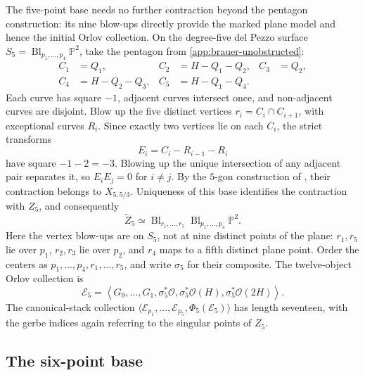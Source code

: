 \documentclass[11pt]{article}
\theoremstyle{plain}
\theoremstyle{definition}
\theoremstyle{remark}
\newcommand{\Pp}{\mathbb P}
\newcommand{\Bl}{\operatorname{Bl}}
\newcommand{\OO}{\mathcal O}
\begin{document}
The five-point base needs no further contraction beyond the pentagon
construction: its nine blow-ups directly provide the marked plane model
and hence the initial Orlov collection.
On the degree-five del Pezzo surface
\(S_5=\Bl_{p_1,\ldots,p_4}\Pp^2\), take the pentagon from
\cref{app:brauer-unobstructed}:
\[
\begin{aligned}
C_1&=Q_1,& C_2&=H-Q_1-Q_2,& C_3&=Q_2,\\
C_4&=H-Q_2-Q_3,& C_5&=H-Q_1-Q_4.
\end{aligned}
\]
Each curve has square \(-1\), adjacent curves intersect once, and
non-adjacent curves are disjoint. Blow up the five distinct vertices
\(r_i=C_i\cap C_{i+1}\), with exceptional curves \(R_i\).
Since exactly two vertices lie on each \(C_i\), the strict transforms
\[
E_i=C_i-R_{i-1}-R_i
\]
have square \(-1-2=-3\). Blowing up the unique intersection of any
adjacent pair separates it, so \(E_iE_j=0\) for \(i\ne j\).
By the \(5\)-gon construction of \cite[Section~3.5]{Corti2016},
their contraction belongs to \(X_{5,5/3}\). Uniqueness of this base
identifies the contraction with \(Z_5\), and consequently
\[
\widetilde Z_5\simeq
\Bl_{r_1,\ldots,r_5}\Bl_{p_1,\ldots,p_4}\Pp^2.
\]
Here the vertex blow-ups are on \(S_5\), not at nine distinct points
of the plane: \(r_1,r_5\) lie over \(p_1\), \(r_2,r_3\) lie over
\(p_2\), and \(r_4\) maps to a fifth distinct plane point.
Order the centers as
\(p_1,\ldots,p_4,r_1,\ldots,r_5\), and write \(\sigma_5\)
for their composite. The twelve-object Orlov collection is
\[
\mathscr E_5=\left\langle G_9,\ldots,G_1,
\sigma_5^*\OO,\sigma_5^*\OO(H),\sigma_5^*\OO(2H)\right\rangle.
\]
The canonical-stack collection
\(\langle\mathcal E_{p_1},\ldots,\mathcal E_{p_5},
\Phi_5(\mathscr E_5)\rangle\) has length seventeen, with the gerbe
indices again referring to the singular points of \(Z_5\).

\subsection{The six-point base}
\label{app:explicit-base-six}
\end{document}
